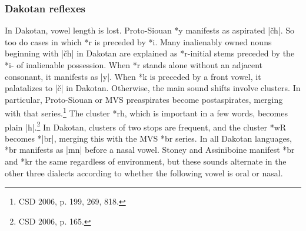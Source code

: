 \documentclass[output=paper]{LSP/langsci}
\begin{document}
\subsubsection{Dakotan reflexes}

In Dakotan, vowel length is lost.  Proto-Siouan *y manifests as aspirated |\v{c}h|.  So too do cases in which *r is preceded by *i.  Many inalienably owned nouns beginning with |\v{c}h| in Dakotan are explained as *r-initial stems preceded by the *i- of inalienable possession.  When *r stands alone without an adjacent consonant, it manifests as |y|.  When *k is preceded by a front vowel, it palatalizes to |\v{c}| in Dakotan.  Otherwise, the main sound shifts involve clusters.  In particular, Proto-Siouan or MVS preaspirates become postaspirates, merging with that series.\footnote{CSD 2006, p. 199, 269, 818.} The cluster *rh, which is important in a few words, becomes plain |h|.\footnote{CSD 2006, p. 165.} In Dakotan, clusters of two stops are frequent, and the cluster *wR becomes *|br|, merging this with the MVS *br series. In all Dakotan languages, *br manifests as |mn| before a nasal vowel.  Stoney and Assiniboine manifest *br and *kr the same regardless of environment, but these sounds alternate in the other three dialects according to whether the following vowel is oral or nasal.
\end{document}
